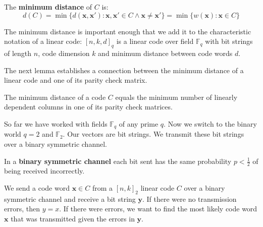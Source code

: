 \begin{defn}\label{hammingDistCodeDef}
The \textbf{minimum distance} of $C$ is:
$$
d(C) = \min \{d(\bm{x}, \bm{x'}) : \bm{x}, \bm{x'} \in C \land \bm{x} \neq \bm{x'} \} = \min \{w(\bm{x}) : \bm{x} \in C \}
$$
\end{defn}

The minimum distance is important enough that we add it to the characteristic notation of a linear code: $[n, k, d]_q$ is a linear  code over field $\mathbb{F}_q$ with bit strings of length $n$, code dimension $k$ and minimum distance between code words $d$.

The next lemma establishes a connection between the minimum distance of a linear code and one of its parity check matrix.

\begin{lem}\label{minCodeParityCheckRel}
The minimum distance of a code $C$ equals the minimum number of linearly dependent columns in one of its parity check matrices. 
\end{lem}


So far we have worked with fields $\mathbb{F}_q$ of any prime $q$. Now we switch to the binary world $q=2$ and $\mathbb{F}_2$. Our vectors are bit strings. We transmit these bit strings over a binary symmetric channel. 

\begin{defn}\label{symChanDef}
In a \textbf{binary symmetric channel} each bit sent has the same probability $p < \frac{1}{2}$ of being received incorrectly.
\end{defn}

We send a code word $\bm{x} \in C$ from a $[n, k]_2$ linear code $C$ over a binary symmetric channel and receive a bit string $\bm{y}$. If there were no transmission errors, then $y=x$. If there were errors, we want to find the most likely code word $\bm{x}$ that was transmitted given the errors in $\bm{y}$.

